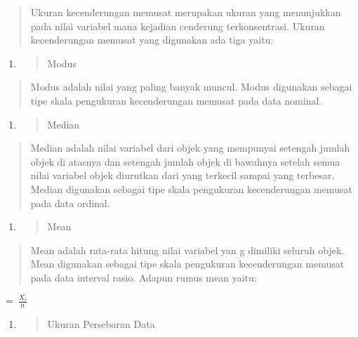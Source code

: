 \documentclass[
]{article}
\begin{document}
\begin{quote}
Ukuran kecenderungan memusat merupakan ukuran yang menunjukkan pada
nilai variabel mana kejadian cenderung terkonsentrasi. Ukuran
kecenderungan memusat yang digunakan ada tiga yaitu:
\end{quote}

\begin{enumerate}
\def\labelenumi{\arabic{enumi}.}
\item
  \begin{quote}
  Modus
  \end{quote}
\end{enumerate}

\begin{quote}
Modus adalah nilai yang paling banyak muncul. Modus digunakan sebagai
tipe skala pengukuran kecenderungan memusat pada data nominal.
\end{quote}

\begin{enumerate}
\def\labelenumi{\arabic{enumi}.}
\setcounter{enumi}{1}
\item
  \begin{quote}
  Median
  \end{quote}
\end{enumerate}

\begin{quote}
Median adalah nilai variabel dari objek yang mempunyai setengah jumlah
objek di atasnya dan setengah jumlah objek di bawahnya setelah semua
nilai variabel objek diurutkan dari yang terkecil sampai yang terbesar.
Median digunakan sebagai tipe skala pengukuran kecenderungan memusat
pada data ordinal.
\end{quote}

\begin{enumerate}
\def\labelenumi{\arabic{enumi}.}
\setcounter{enumi}{2}
\item
  \begin{quote}
  Mean
  \end{quote}
\end{enumerate}

\begin{quote}
Mean adalah rata-rata hitung nilai variabel yan g dimiliki seluruh
objek. Mean digunakan sebagai tipe skala pengukuran kecenderungan
memusat pada data interval rasio. Adapun rumus mean yaitu:
\end{quote}

\(= \ \frac{X_{i}}{n}\ \)

\begin{enumerate}
\def\labelenumi{\Alph{enumi}.}
\setcounter{enumi}{2}
\item
  \begin{quote}
  Ukuran Persebaran Data
  \end{quote}
\end{enumerate}
\end{document}
